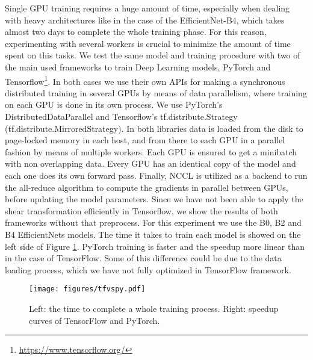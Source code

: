 \documentclass[runningheads]{llncs}
\begin{document}
Single GPU training requires a huge amount of time, especially when dealing with heavy architectures like in the case of the EfficientNet-B4, which takes almost two days to complete the whole training phase. For this reason, experimenting with several workers is crucial to minimize the amount of time spent on this tasks. We test the same model and training procedure with two of the main used frameworks to train Deep Learning models, PyTorch and Tensorflow\footnote{\url{https://www.tensorflow.org/}}. In both cases we use their own APIs for making a synchronous distributed training in several GPUs by means of data parallelism, where training on each GPU is done in its own process. We use PyTorch's DistributedDataParallel and Tensorflow's tf.distribute.Strategy (tf.distribute.MirroredStrategy). In both libraries data is loaded from the disk to page-locked memory in each host, and from there to each GPU in a parallel fashion by means of multiple workers. Each GPU is ensured to get a minibatch with non overlapping data. Every GPU has an identical copy of the model and each one does its own forward pass. Finally, NCCL is utilized as a backend to run the all-reduce algorithm to compute the gradients in parallel between GPUs, before updating the model parameters. Since we have not been able to apply the shear transformation efficiently in Tensorflow, we show the results of both frameworks without that preprocess.
For this experiment we use the B0, B2 and B4 EfficientNets models.  The time it takes to train each model is showed on the left side of Figure \ref{fig:tfvspy}. PyTorch training is faster and the speedup more linear than in the case of TensorFlow. Some of this difference could be due to the data loading process, which we have not fully optimized in TensorFlow framework.

\begin{figure}
	\begin{centering}
	\texttt{[image: figures/tfvspy.pdf]}
	\caption{Left: the time to complete a whole training process. Right: speedup curves of TensorFlow and PyTorch.}
	\label{fig:tfvspy}
	\end{centering}
\end{figure}

\begin{comment}
\begin{figure}
	\begin{centering}
	\texttt{[image: figures/tfspeedup.pdf]}
	\caption{Tensorflow vs PyTorch speedup.}
	\label{fig:tfvspy_speedup}
	\end{centering}
	\vspace{-5mm}
\end{figure}
\end{comment}
\end{document}
